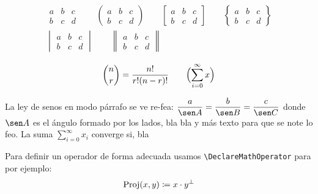 \begin{gather*}
  \begin{matrix}
    a & b & c \\
    b & c & d
  \end{matrix}\qquad
  \begin{pmatrix}
    a & b & c \\
    b & c & d
  \end{pmatrix}\qquad
  \begin{bmatrix}
    a & b & c \\
    b & c & d
  \end{bmatrix}\qquad 
  \begin{Bmatrix}
    a & b & c \\
    b & c & d
  \end{Bmatrix}\\[10pt]
  \begin{vmatrix}
    a & b & c \\
    b & c & d
  \end{vmatrix}\qquad  
  \begin{Vmatrix}
    a & b & c \\
    b & c & d
  \end{Vmatrix}\qquad
\end{gather*}


\begin{equation*}
\binom{n}{r} = \frac{n!}{r!(n-r)!}\qquad
\Bigl(\sum_{i=0}^{\infty} x \Bigr)
\end{equation*}

La ley de senos en modo párrafo se ve re-fea: $\displaystyle{\frac{a}{\sen A} =\frac{b}{\sen B} = \frac{c}{\sen C}}$ donde $\sen A$ es el ángulo formado por los lados, bla bla y más texto para que se note lo feo. La suma $\sum_{i=0}^{\infty} x_i$ converge si, bla

Para definir un operador de forma adecuada usamos \verb+\DeclareMathOperator+ para por ejemplo:
\begin{equation*}
  \operatorname{Proj}(x,y) \coloneq x\cdot y^\perp
\end{equation*}

\endinput